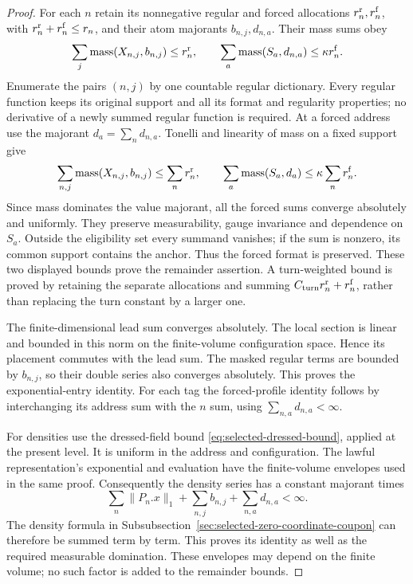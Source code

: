 \begin{proof}
For each $n$ retain its nonnegative regular and forced allocations
$r_n^{\rm r},r_n^{\rm f}$, with
$r_n^{\rm r}+r_n^{\rm f}\le r_n$, and their atom majorants
$b_{n,j},d_{n,a}$. Their mass sums obey
\[
 \sum_j\operatorname{mass}(X_{n,j},b_{n,j})\le r_n^{\rm r},
 \qquad
 \sum_a\operatorname{mass}(S_a,d_{n,a})\le\kappa r_n^{\rm f}.
\]
Enumerate the pairs $(n,j)$ by one countable regular dictionary.
Every regular function keeps its original support and all its format
and regularity properties; no derivative of a newly summed regular
function is required. At a forced address use the majorant
$d_a=\sum_n d_{n,a}$. Tonelli and linearity of mass on a fixed
support give
\[
 \sum_{n,j}\operatorname{mass}(X_{n,j},b_{n,j})
       \le\sum_n r_n^{\rm r},\qquad
 \sum_a\operatorname{mass}(S_a,d_a)
       \le\kappa\sum_n r_n^{\rm f}.
\]
Since mass dominates the value majorant, all the forced sums converge
absolutely and uniformly. They preserve measurability, gauge invariance
and dependence on $S_a$. Outside the eligibility set every summand
vanishes; if the sum is nonzero, its common support contains the
anchor. Thus the forced format is preserved. These two displayed
bounds prove the remainder assertion. A turn-weighted bound is proved
by retaining the separate allocations and summing
$C_{\rm turn}r_n^{\rm r}+r_n^{\rm f}$, rather than replacing the
turn constant by a larger one.

The finite-dimensional lead sum converges absolutely. The local
section is linear and bounded in this norm on the finite-volume
configuration space. Hence its placement commutes with the lead sum.
The masked regular terms are bounded by $b_{n,j}$, so their double
series also converges absolutely. This proves the exponential-entry
identity. For each tag the forced-profile identity follows by
interchanging its address sum with the $n$ sum, using
$\sum_{n,a}d_{n,a}<\infty$.

For densities use the dressed-field bound
\eqref{eq:selected-dressed-bound}, applied at the present level.
It is uniform in the address and configuration. The lawful
representation's exponential and evaluation have the finite-volume
envelopes used in the same proof. Consequently the density series has
a constant majorant times
\[
 \sum_n\|P_n.x\|_1+\sum_{n,j}b_{n,j}+\sum_{n,a}d_{n,a}<\infty.
\]
The density formula in Subsubsection~\ref{sec:selected-zero-coordinate-coupon}
can therefore be summed term by term. This proves its identity as
well as the required measurable domination. These envelopes may
depend on the finite volume; no such factor is added to the remainder
bounds.
\end{proof}

